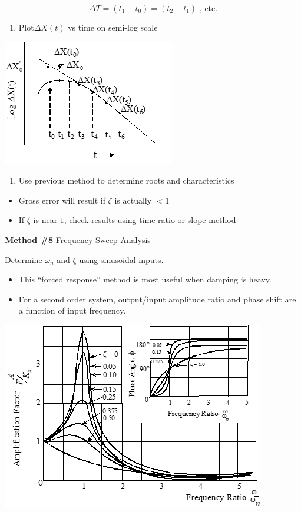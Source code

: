 \documentclass[
]{book}
\providecommand{\tightlist}{%
  \setlength{\itemsep}{0pt}\setlength{\parskip}{0pt}}
\begin{document}
\[
\Delta T = \left( t_1 - t_0 \right) = \left( t_2 - t_1 \right) \text{ , etc.}
\]

\begin{enumerate}
\def\labelenumi{\arabic{enumi}.}
\setcounter{enumi}{1}
\tightlist
\item
  Plot\(\Delta X \left(t \right)\) vs time on semi-log scale
\end{enumerate}

\includegraphics{media/08/image92.png}

\begin{enumerate}
\def\labelenumi{\arabic{enumi}.}
\setcounter{enumi}{2}
\tightlist
\item
  Use previous method to determine roots and characteristics
\end{enumerate}

\begin{itemize}
\tightlist
\item
  Gross error will result if \(\zeta\) is actually \(\lt 1\)
\item
  If \(\zeta\) is near \(1\), check results using time ratio or slope method
\end{itemize}

\textbf{Method \#8} Frequency Sweep Analysis

Determine \(\omega_n\) and \(\zeta\) using sinusoidal inputs.

\begin{itemize}
\tightlist
\item
  This ``forced response'' method is most useful when damping is heavy.
\item
  For a second order system, output/input amplitude ratio and phase shift are a function of input frequency.
\end{itemize}

\includegraphics{media/08/image93.png}
\end{document}
